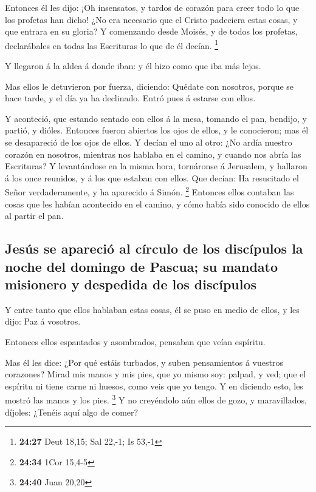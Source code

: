  Entonces él les dijo: ¡Oh insensatos, y tardos de corazón
para creer todo lo que los profetas han dicho!  ¿No era
necesario que el Cristo padeciera estas cosas, y que entrara en su
gloria?  Y comenzando desde Moisés, y de todos los
profetas, declarábales en todas las Escrituras lo que de él decían.
\footnote{\textbf{24:27} Deut 18,15; Sal 22,-1; Is 53,-1}

 Y llegaron á la aldea á donde iban: y él hizo como que iba
más lejos.

 Mas ellos le detuvieron por fuerza, diciendo: Quédate con
nosotros, porque se hace tarde, y el día ya ha declinado. Entró pues á
estarse con ellos.

 Y aconteció, que estando sentado con ellos á la mesa,
tomando el pan, bendijo, y partió, y dióles.  Entonces
fueron abiertos los ojos de ellos, y le conocieron; mas él se
desapareció de los ojos de ellos.  Y decían el uno al otro:
¿No ardía nuestro corazón en nosotros, mientras nos hablaba en el
camino, y cuando nos abría las Escrituras?  Y levantándose
en la misma hora, tornáronse á Jerusalem, y hallaron á los once
reunidos, y á los que estaban con ellos.  Que decían: Ha
resucitado el Señor verdaderamente, y ha aparecido á Simón. \footnote{\textbf{24:34}
  1Cor 15,4-5}  Entonces ellos contaban las cosas que les
habían acontecido en el camino, y cómo había sido conocido de ellos al
partir el pan.

\hypertarget{jesuxfas-se-apareciuxf3-al-cuxedrculo-de-los-discuxedpulos-la-noche-del-domingo-de-pascua-su-mandato-misionero-y-despedida-de-los-discuxedpulos}{%
\subsection{Jesús se apareció al círculo de los discípulos la noche del
domingo de Pascua; su mandato misionero y despedida de los
discípulos}\label{jesuxfas-se-apareciuxf3-al-cuxedrculo-de-los-discuxedpulos-la-noche-del-domingo-de-pascua-su-mandato-misionero-y-despedida-de-los-discuxedpulos}}

 Y entre tanto que ellos hablaban estas cosas, él se puso
en medio de ellos, y les dijo: Paz á vosotros.

 Entonces ellos espantados y asombrados, pensaban que veían
espíritu.

 Mas él les dice: ¿Por qué estáis turbados, y suben
pensamientos á vuestros corazones?  Mirad mis manos y mis
pies, que yo mismo soy: palpad, y ved; que el espíritu ni tiene carne ni
huesos, como veis que yo tengo.  Y en diciendo esto, les
mostró las manos y los pies. \footnote{\textbf{24:40} Juan 20,20}
 Y no creyéndolo aún ellos de gozo, y maravillados,
díjoles: ¿Tenéis aquí algo de comer?

